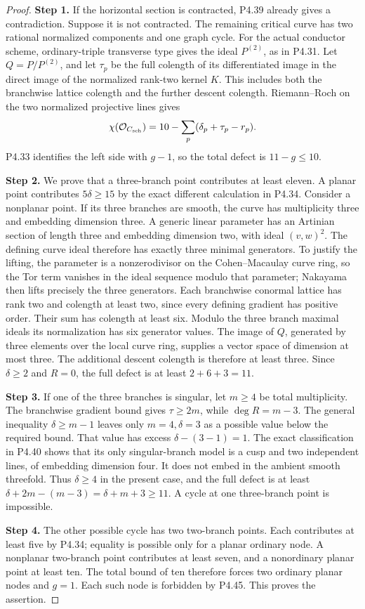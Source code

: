 \begin{proof}
\noindent\textbf{Step 1.} If the horizontal section is contracted, P4.39 already
gives a contradiction. Suppose it is not contracted.
The remaining critical curve has two rational normalized
components and one graph cycle. For the actual
conductor scheme, ordinary-triple transverse type gives
the ideal $P^{(2)}$, as in P4.31. Let $Q=P/P^{(2)}$,
and let $\tau_p$ be the full colength of its differentiated
image in the direct image of the normalized rank-two
kernel $K$. This includes both the branchwise lattice
colength and the further descent colength. Riemann--Roch
on the two normalized projective lines gives
\[
 \chi(\mathcal O_{C_{\rm sch}})
       =10-\sum_p(\delta_p+\tau_p-r_p).
\]
P4.33 identifies the left side with $g-1$, so the total
defect is $11-g\le10$.

\noindent\textbf{Step 2.} We prove that a three-branch point contributes at least
eleven. A planar point contributes $5\delta\ge15$ by
the exact different calculation in P4.34. Consider a
nonplanar point. If its three branches are smooth, the
curve has multiplicity three and embedding dimension
three. A generic linear parameter has an Artinian
section of length three and embedding dimension two,
with ideal $(v,w)^2$. The defining curve ideal therefore
has exactly three minimal generators. To justify the
lifting, the parameter is a nonzerodivisor on the
Cohen--Macaulay curve ring, so the Tor term vanishes in
the ideal sequence modulo that parameter; Nakayama
then lifts precisely the three generators.
Each branchwise conormal lattice has rank two and
colength at least two, since every defining gradient
has positive order. Their sum has colength at least
six. Modulo the three branch maximal ideals its
normalization has six generator values. The image of
$Q$, generated by three elements over the local curve
ring, supplies a vector space of dimension at most
three. The additional descent colength is therefore
at least three. Since $\delta\ge2$ and $R=0$, the
full defect is at least $2+6+3=11$.

\noindent\textbf{Step 3.} If one of the three branches is singular, let $m\ge4$
be total multiplicity. The branchwise gradient bound
gives $\tau\ge2m$, while $\deg R=m-3$.
The general inequality $\delta\ge m-1$ leaves only
$m=4,\delta=3$ as a possible value below the required
bound. That value has excess $\delta-(3-1)=1$.
The exact classification in P4.40 shows that its only
singular-branch model is a cusp and two independent
lines, of embedding dimension four. It does not embed
in the ambient smooth threefold. Thus $\delta\ge4$
in the present case, and the full defect is at least
$\delta+2m-(m-3)=\delta+m+3\ge11$.
A cycle at one three-branch point is impossible.

\noindent\textbf{Step 4.} The other possible cycle has two two-branch points.
Each contributes at least five by P4.34; equality is
possible only for a planar ordinary node. A nonplanar
two-branch point contributes at least seven, and a
nonordinary planar point at least ten. The total bound
of ten therefore forces two ordinary planar nodes
and $g=1$. Each such node is forbidden by P4.45.
This proves the assertion.
\end{proof}

